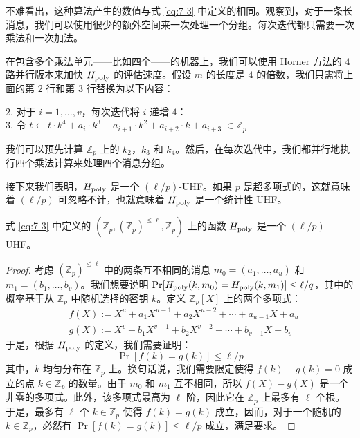 \vspace{5pt}

\noindent
不难看出，这种算法产生的数值与式 \ref{eq:7-3} 中定义的相同。观察到，对于一条长消息，我们可以使用很少的额外空间来一次处理一个分组。每次迭代都只需要一次乘法和一次加法。
 
在包含多个乘法单元——比如四个——的机器上，我们可以使用 Horner 方法的 $4$ 路并行版本来加快 $H_{\rm poly}$ 的评估速度。假设 $m$ 的长度是 $4$ 的倍数，我们只需将上面的第 $2$ 行和第 $3$ 行替换为以下内容：

\vspace{5pt}

\hspace*{5pt} 2. \quad 对于 $i=1,\dots,v$，每次迭代将 $i$ 递增 $4$：\\
\hspace*{26pt} 3. \quad\quad\quad 令 $t\leftarrow t\cdot k^4+a_i\cdot k^3+a_{i+1}\cdot k^2+a_{i+2}\cdot k+a_{i+3}\;\in\mathbb{Z}_p$

\vspace{5pt}

\noindent
我们可以预先计算 $\mathbb{Z}_p$ 上的 $k_2$，$k_3$ 和 $k_4$。然后，在每次迭代中，我们都并行地执行四个乘法计算来处理四个消息分组。

\begin{snote}
接下来我们表明，$H_{\rm poly}$ 是一个 ${(\ell/p)}$-UHF。如果 $p$ 是超多项式的，这就意味着 ${(\ell/p)}$ 可忽略不计，也就意味着 $H_{\rm poly}$ 是一个统计性 UHF。
\end{snote}

\begin{lemma}\label{lemma:7-2}
式 \ref{eq:7-3} 中定义的 $(\mathbb{Z}_p,(\mathbb{Z}_p)^{\leq\ell},\mathbb{Z}_p)$ 上的函数 $H_{\rm poly}$ 是一个 ${(\ell/p)}$-UHF。
\end{lemma}

\begin{proof}
考虑 $(\mathbb{Z}_p)^{\leq\ell}$ 中的两条互不相同的消息 $m_0=(a_1,\dots,a_u)$  和 $m_1=(b_1,\dots,b_v)$。我们想要说明 $\Pr[H_{\rm poly} (k,m_0) = H_{\rm poly} (k,m_1)] \leq {\ell/q}$，其中的概率基于从 $\mathbb{Z}_p$ 中随机选择的密钥 $k$。定义 $\mathbb{Z}_p[X]$ 上的两个多项式：
\begin{equation}	\label{eq:7-4}
\begin{aligned}
& f(X):=X^u+a_1X^{u-1}+a_2X^{u-2}+\cdots+a_{u-1}X+a_u\\
& g(X):=X^v+b_1X^{v-1}+b_2X^{v-2}+\cdots+b_{v-1}X+b_v
\end{aligned}
\end{equation}
于是，根据 $H_{\rm poly}$ 的定义，我们需要证明：
\[
\Pr[f(k)=g(k)]\leq{\ell/p}
\]
其中，$k$ 均匀分布在 $\mathbb{Z}_p$ 上。换句话说，我们需要限定使得 $f(k)-g(k)=0$ 成立的点 $k\in\mathbb{Z}_p$ 的数量。由于 $m_0$ 和 $m_1$ 互不相同，所以 $f(X)-g(X)$ 是一个非零的多项式。此外，该多项式最高为 $\ell$ 阶，因此它在 $\mathbb{Z}_p$ 上最多有 $\ell$ 个根。于是，最多有 $\ell$ 个 $k\in\mathbb{Z}_p$ 使得 $f(k)=g(k)$ 成立，因而，对于一个随机的 $k\in\mathbb{Z}_p$，必然有 $\Pr[f(k)=g(k)]\leq{\ell/p}$ 成立，满足要求。
\end{proof}

